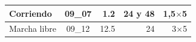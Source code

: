 \begin{table}[h!]
\begin{tabular}{|l|c|r|r|r|}
Corriendo                                                                        & 09\_07                     & 1.2                                                                                    & 24 y 48                      &1,5$\times $5                                                                              \\ \hline
Marcha libre                                                                     & 09\_12                     & 12.5                                                                                   & 24                           &3$\times $5                                                                              \\ \hline
\end{tabular}
\end{table}


